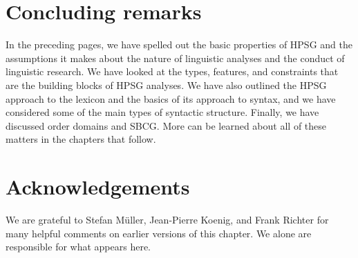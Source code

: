 \documentclass[output=paper
	        ,collection
	        ,collectionchapter
 	        ,biblatex
                ,babelshorthands
                ,newtxmath
                ,draftmode
                ,colorlinks, citecolor=brown
]{langscibook}
\begin{document}
\section{Concluding remarks}\label{sec:prop8}

In the preceding pages, we have spelled out the basic properties of HPSG and the assumptions it makes about the nature of linguistic analyses and the conduct of linguistic research. We have looked at the types, features, and constraints that are the building blocks of HPSG analyses. We have also outlined the HPSG approach to the lexicon and the basics of its approach to syntax, and we have considered some of the main types of syntactic structure. Finally, we have discussed order domains and SBCG. More can be learned about all of these matters in the chapters that follow.


\section*{Acknowledgements}

We are grateful to Stefan Müller, Jean-Pierre Koenig, and Frank Richter for many helpful comments on
earlier versions of this chapter. We alone are responsible for what appears here.



{\sloppy
\printbibliography[heading=subbibliography,notkeyword=this]
}
\end{document}
